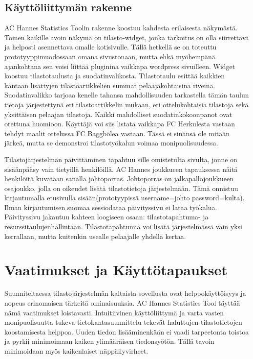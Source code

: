 \documentclass[12pt]{article} %
\begin{document}
\subsection{Käyttöliittymän rakenne} %
AC Hannes Statistics Toolin rakenne koostuu kahdesta erilaisesta näkymästä. Toinen kaikille avoin näkymä on tilasto-widget, jonka tarkoitus on olla siirrettävä ja helposti asennettava omalle kotisivulle. Tällä hetkellä se on toteuttu prototyyppimuodossaan omana sivustonaan, mutta ehkä myöhempänä ajankohtana sen voisi liittää pluginina vaikkapa wordpress sivuilleen. Widget koostuu tilastotaulusta ja suodatinvalikosta. Tilastotaulu esittää kaikkien kantaan lisättyjen tilastoartikkelien summat pelaajakohtaisina riveinä. Suodatinvalikko tarjoaa kenelle tahansa mahdollisuuden tarkastella tämän taulun tietoja järjestettynä eri tilastoartikkelin mukaan, eri ottelukohtaisia tilastoja sekä yksittäisen pelaajan tilastoja. Kaikki mahdolliset suodatinkokoonpanot ovat otettuna huomioon. Käyttäjä voi siis listata vaikkapa FC Herkulesta vastaan tehdyt maalit ottelussa FC Baggbölea vastaan. Tässä ei sinänsä ole mitään järkeä, mutta se demonstroi tilastotyökalun voimaa monipuolisuudessa.

Tilastojärjestelmän päivittäminen tapahtuu sille omistetulta sivulta, jonne on sisäänpääsy vain tietyillä henkilöillä. AC Hannes joukkueen tapauksessa näitä henkilöitä kuvataan sanalla johtoporras. Johtoporras on jalkapallojoukkueen osajoukko, jolla on oikeudet lisätä tilastotietoja järjestelmään. Tämä onnistuu kirjautumalla etusivulla sisään(prototyypissä username=johto password=kulta). Ilman kirjautumisen suomaa sessiodataa päivityssivu ei lataa työkalua. Päivityssivu jakautuu kahteen loogiseen osaan: tilastotapahtuma- ja resurssitaulujenhallintaan. Tilastotapahtumia voi lisätä järjestelmässä vain yksi kerrallaan, mutta kuitenkin usealle pelaajalle yhdellä kertaa.


\section{Vaatimukset ja Käyttötapaukset} %
Suunniteltaessa tilastojärjestelmän kaltaista sovellusta ovat helppokäyttöisyys ja nopeus erinomaisen tärkeitä ominaisuuksia. AC Hannes Statistics Tool täyttää nämä vaatimukset loistavasti. Intuitiivinen käyttöliittymä ja varta vasten monipuolisuutta tukeva tietokantasuunnittelu tekevät haluttujen tilastotietojen koostamisesta helppoa. Uuden tiedon lisääminenkään ei vaadi tarpeetonta toistoa ja pyrkii minimoimaan kaiken ylimääräisen tiedonsyötön. Tällä tavoin minimoidaan myös kaikenlaiset näppäilyvirheet.
\end{document}
